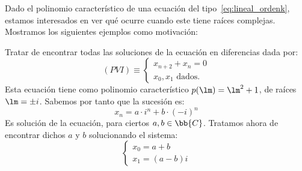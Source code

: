 Dado el polinomio característico de una ecuación del tipo~\ref{eq:lineal_ordenk}, estamos interesados en ver qué ocurre cuando este tiene raíces complejas. Mostramos los siguientes ejemplos como motivación:

\begin{ejemplo} Tratar de encontrar todas las soluciones de la ecuación en diferencias dada por:
    \begin{equation*}
        (PVI)\equiv \left\{ \begin{array}{l}
            x_{n+2} + x_n = 0 \\
            x_0, x_1 \text{\ dados.}
        \end{array}\right.
    \end{equation*}
    Esta ecuación tiene como polinomio característico $p(\lm) = \lm^2+1$, de raíces $\lm = \pm i$. Sabemos por tanto que la sucesión es:
    \begin{equation*}
        x_n = a\cdot i^n  + b\cdot {(-i)}^n
    \end{equation*}
    Es solución de la ecuación, para ciertos $a, b \in \bb{C}$. Tratamos ahora de encontrar dichos $a$ y $b$ solucionando el sistema:
    \begin{equation*}
        \left\{\begin{array}{l}
            x_0 = a + b \\
            x_1 = (a-b)i
        \end{array} \right.
    \end{equation*}


\end{ejemplo}
